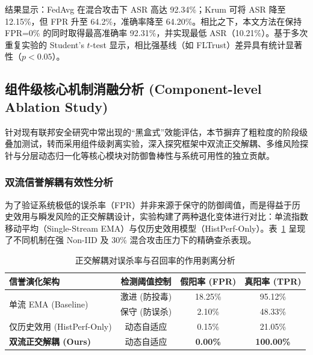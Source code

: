 \documentclass[11pt, a4paper, UTF8, fontset=fandol]{ctexart}
\begin{document}
结果显示：FedAvg 在混合攻击下 ASR 高达 92.34\%；Krum 可将 ASR 降至 12.15\%，但 FPR 升至 64.2\%，准确率降至 64.20\%。相比之下，本文方法在保持 FPR=0\% 的同时取得最高准确率 92.31\%，并实现最低 ASR（10.21\%）。基于多次重复实验的 Student's $t$-test 显示，相比强基线（如 FLTrust）差异具有统计显著性（$p<0.05$）。

\subsection{组件级核心机制消融分析 (Component-level Ablation Study)}
针对现有联邦安全研究中常出现的“黑盒式”效能评估，本节摒弃了粗粒度的阶段级叠加测试，转而采用组件级剥离实验，深入探究框架中双流正交解耦、多维风险探针与分层动态归一化等核心模块对防御鲁棒性与系统可用性的独立贡献。

\subsubsection{双流信誉解耦有效性分析}
为了验证系统极低的误杀率（FPR）并非来源于保守的防御阈值，而是得益于历史效用与瞬发风险的正交解耦设计，实验构建了两种退化变体进行对比：单流指数移动平均（Single-Stream EMA）与仅历史效用模型（HistPerf-Only）。表~\ref{tab:ablation_stream} 呈现了不同机制在强 Non-IID 及 30\% 混合攻击压力下的精确查杀表现。

\begin{table}[htbp]
    \centering
    \caption{正交解耦对误杀率与召回率的作用剥离分析}
    \label{tab:ablation_stream}
    \begin{tabular}{l c c c}
        \toprule
        \textbf{信誉演化架构}                & \textbf{检测阈值控制} & \textbf{假阳率 (FPR)} & \textbf{真阳率 (TPR)} \\
        \midrule
        \multirow{2}{*}{单流 EMA (Baseline)} & 激进 (防投毒)         & 18.25\%               & 95.12\%               \\
                                             & 保守 (防误杀)         & 2.10\%                & 48.33\%               \\
        \midrule
        仅历史效用 (HistPerf-Only)           & 动态自适应            & 0.15\%                & 21.05\%               \\
        \textbf{双流正交解耦 (Ours)}         & 动态自适应            & \textbf{0.00\%}       & \textbf{100.00\%}     \\
        \bottomrule
    \end{tabular}
\end{table}
\end{document}
